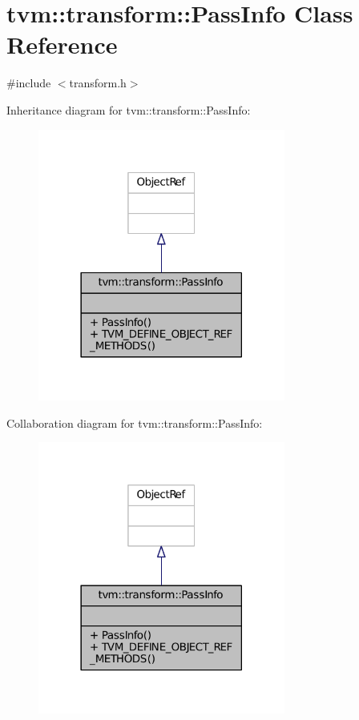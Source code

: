 \hypertarget{classtvm_1_1transform_1_1PassInfo}{}\section{tvm\+:\+:transform\+:\+:Pass\+Info Class Reference}
\label{classtvm_1_1transform_1_1PassInfo}


{\ttfamily \#include $<$transform.\+h$>$}



Inheritance diagram for tvm\+:\+:transform\+:\+:Pass\+Info\+:
\nopagebreak
\begin{figure}[H]
\begin{center}
\leavevmode
\includegraphics[width=230pt]{classtvm_1_1transform_1_1PassInfo__inherit__graph}
\end{center}
\end{figure}


Collaboration diagram for tvm\+:\+:transform\+:\+:Pass\+Info\+:
\nopagebreak
\begin{figure}[H]
\begin{center}
\leavevmode
\includegraphics[width=230pt]{classtvm_1_1transform_1_1PassInfo__coll__graph}
\end{center}
\end{figure}
